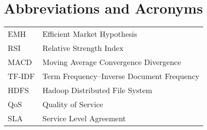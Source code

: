 \chapter*{Abbreviations and Acronyms}


\noindent
\begin{longtable}{@{}p{}p{}@{}}
EMH & Efficient Market Hypothesis \\
RSI & Relative Strength Index \\
MACD & Moving Average Convergence Divergence \\
TF-IDF & Term Frequency–Inverse Document Frequency \\
HDFS & Hadoop Distributed File System \\
QoS & Quality of Service \\
SLA & Service Level Agreement

\end{longtable}
